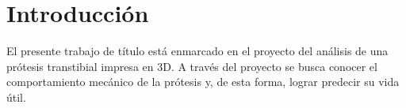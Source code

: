 \chapter{Introducción}



El presente trabajo de título está enmarcado en el proyecto del análisis de una prótesis transtibial impresa en 3D. A través del proyecto se busca conocer el comportamiento mecánico de la prótesis y, de esta forma, lograr predecir su vida útil.

